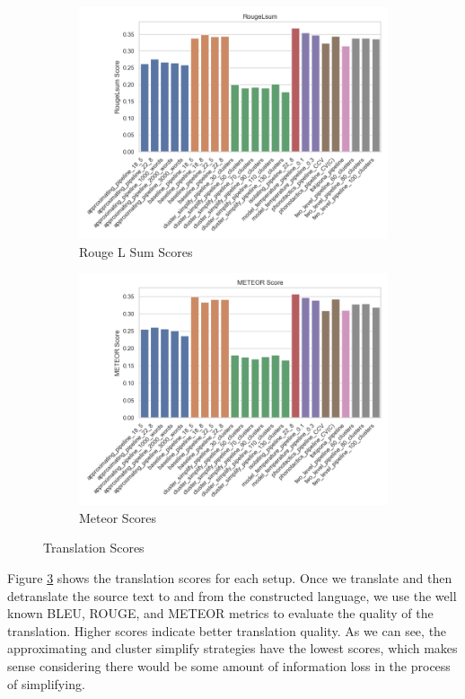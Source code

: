 \begin{figure}[H]
    \begin{subfigure}[b]{0.48\linewidth}
        \includegraphics[width=0.7\linewidth]{figures/results/rougeLsum_scores.png}
        \caption{Rouge L Sum Scores}
        \label{fig:rougelsum-scores}
    \end{subfigure}
    \hfill
    \begin{subfigure}[b]{0.48\linewidth}
        \includegraphics[width=0.7\linewidth]{figures/results/meteor_scores.png}
        \caption{Meteor Scores}
        \label{fig:meteor-scores}
    \end{subfigure}
    \caption{Translation Scores}
    \label{fig:translation-statistics}
\end{figure}

Figure \ref{fig:translation-statistics} shows the translation scores for each setup. Once we translate and then detranslate the source text to and from the constructed language, 
we use the well known BLEU, ROUGE, and METEOR metrics to evaluate the quality of the translation. Higher scores indicate better translation quality.
As we can see, the approximating and cluster simplify strategies have the lowest scores, which makes sense considering there would be some amount of information loss in the process of
simplifying. 

